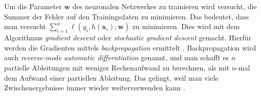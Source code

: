 Um die Parameter $\mathbf{w}$ des neuronalen Netzwerkes zu trainieren wird versucht, die Summer der Fehler auf den Trainingsdaten zu minimieren. Das bedeutet, dass 
man versucht $\sum_{i=1}^n \ell(y_i, h(\mathbf{x}_i); \mathbf{w})$ zu minimieren. Dies wird mit dem Algorithmus \textit{gradient descent} oder \textit{stochastic gradient descent}
gemacht. Hierf\"ur werden die Gradienten mittels \textit{backpropagation} ermittelt \cite{werbos}. Backpropagation wird auch \textit{reverse-mode automatic differntiation} genannt, und man 
schafft es $n$ partielle Ableitungen mit weniger Rechenaufwand zu berechnen, als mit $n$-mal dem Aufwand einer partiellen Ableitung. Das gelingt, weil man viele 
Zwischenergebnisse immer wieder weiterverwenden kann \cite{strang}.